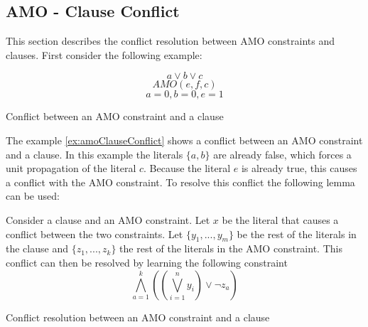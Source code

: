 \subsection{AMO - Clause Conflict}

This section describes the conflict resolution between AMO constraints and clauses. First consider the following example:

\begin{example}
\begin{leftbar}
\begin{displaymath}
a \vee b \vee c
\end{displaymath}
\begin{displaymath}
AMO(e,f,c)
\end{displaymath}
\begin{displaymath}
a = 0, b = 0, e = 1
\end{displaymath}
\end{leftbar}
\caption{Conflict between an AMO constraint and a clause}
\label{ex:amoClauseConflict}
\end{example}

The example \ref{ex:amoClauseConflict} shows a conflict between an AMO constraint and a clause. In this example the literals $\{a,b\}$ are already false, which forces a unit propagation of the literal $c$. Because the literal $e$ is already true, this causes a conflict with the AMO constraint. To resolve this conflict the following lemma can be used:

\begin{lemma}
\begin{leftbar}
Consider a clause and an AMO constraint. Let $x$ be the literal that causes a conflict between the two constraints. Let $\{y_1,...,y_m\}$ be the rest of the literals in the clause and $\{z_1,...,z_k\}$ the rest of the literals in the AMO constraint.
This conflict can then be resolved by learning the following constraint
\begin{displaymath}
\bigwedge_{a=1}^{k}((\bigvee_{i=1}^{n}y_i)\vee \neg z_a)
\end{displaymath}

\end{leftbar}
\caption{Conflict resolution between an AMO constraint and a clause}
\label{le:amoClauseConflict}
\end{lemma}

